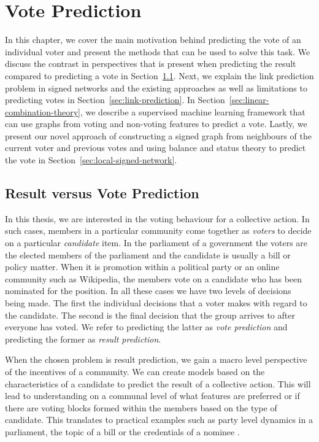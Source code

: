 \chapter{Vote Prediction}
\label{chp:vote-prediction}
In this chapter, we cover the main motivation behind predicting the vote of an individual voter and present the methods that can be used to solve this task. We discuss the contrast in perspectives that is present when predicting the result compared to predicting a vote in Section~\ref{sec:result-vs-vote}. Next, we explain the link prediction problem in signed networks and the existing approaches as well as limitations to predicting votes in Section~\ref{sec:link-prediction}. In Section~\ref{sec:linear-combination-theory}, we describe a supervised machine learning framework that can use graphs from voting and non-voting features to predict a vote. Lastly, we present our novel approach of constructing a signed graph from neighbours of the current voter and previous votes and using balance and status theory to predict the vote in Section~\ref{sec:local-signed-network}. 


\section{Result versus Vote Prediction}
\label{sec:result-vs-vote}
In this thesis, we are interested in the voting behaviour for a collective action. In such cases, members in a particular community come together as \textit{voters} to decide on a particular \textit{candidate} item. In the parliament of a government the voters are the elected members of the parliament and the candidate is usually a bill or policy matter. When it is promotion within a political party or an online community such as Wikipedia, the members vote on a candidate who has been nominated for the position. In all these cases we have two levels of decisions being made. The first the individual decisions that a voter makes with regard to the candidate. The second is the final decision that the group arrives to after everyone has voted. We refer to predicting the latter as \textit{vote prediction} and predicting the former as \textit{result prediction}. 

When the chosen problem is result prediction, we gain a macro level perspective of the incentives of a community. We can create models based on the characteristics of a candidate to predict the result of a collective action. This will lead to understanding on a communal level of what features are preferred or if there are voting blocks formed within the members based on the type of candidate. This translates to practical examples such as party level dynamics in a parliament, the topic of a bill or the credentials of a nominee \cite{burke2008mopping,yano2012textual,yogatama-etal-2011-predicting}. 

